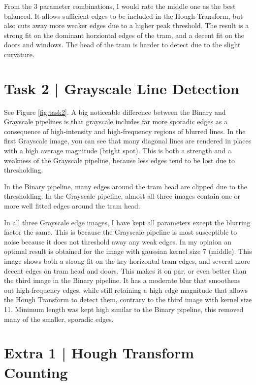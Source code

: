 \documentclass[10pt, a4paper]{article}
\begin{document}
From the 3 parameter combinations, I would rate the middle one as the best balanced. It allows sufficient edges to
be included in the Hough Transform, but also cuts away more weaker edges due to a higher peak threshold. The result is a
strong fit on the dominant horziontal edges of the tram, and a decent fit on the doors and windows. The head of the tram is
harder to detect due to the slight curvature.

\section*{Task 2 | Grayscale Line Detection} %

See Figure \ref{fig:task2}. 
A big noticeable difference between the Binary and Grayscale pipelines is that
grayscale includes far more sporadic edges as a consequence of high-intensity and high-frequency regions of
blurred lines. In the first Grayscale image, you can see that many diagonal lines are rendered
in places with a high average magnitude (bright spot). This is both a strength and a weakness of
the Grayscale pipeline, because less edges tend to be lost due to thresholding.

In the Binary pipeline, many edges around the tram head are clipped due to the thresholding.
In the Grayscale pipeline, almost all three images contain one or more well fitted edges around 
the tram head.

In all three Grayscale edge images, I have kept all parameters except the blurring factor the same.
This is because the Grayscale pipeline is most susceptible to noise because it does not threshold away any
weak edges. In my opinion an optimal result is obtained for the image with gaussian kernel size 7 (middle).
This image shows both a strong fit on the key horizontal tram edges, and several more decent edges on 
tram head and doors. This makes it on par, or even better than the third image in the Binary pipeline.
It has a moderate blur that smoothens out high-frequency edges, while still retaining a high edge magnitude
that allows the Hough Transform to detect them, contrary to the third image with kernel size 11.
Minimum length was kept high similar to the Binary pipeline, this removed many of the smaller, sporadic edges.

\section*{Extra 1 | Hough Transform Counting }
\end{document}
